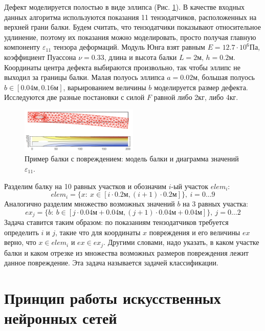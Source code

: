 \documentclass[a4paper,12pt]{article}
\theoremstyle{remark}
\begin{document}
	Дефект моделируется полостью в виде эллипса (Рис. \ref{fig:beam_sample}). В качестве входных данных алгоритма используются показания 11 тензодатчиков, расположенных на верхней грани балки. Будем считать, что тензодатчики показывают относительное удлинение, поэтому их показания можно моделировать, просто получая главную компоненту $\varepsilon_{11}$ тензора деформаций. Модуль Юнга взят равным $E = 12.7 \cdot 10^6 \text{Па}$, коэффициент Пуассона $\nu = 0.33$, длина и высота балки $L = 2 \text{м, } h = 0.2 \text{м}$. Координаты центра дефекта выбираются произвольно, так чтобы эллипс не выходил за границы балки. Малая полуось эллипса $a = 0.02 \text{м}$, большая полуось $b \in [0.04\text{м}, 0.16\text{м}]$, варьированием величины $b$ моделируется размер дефекта. Исследуются две разные постановки с силой $F$ равной либо 2кг, либо 4кг.
	\begin{figure}[h]
		\centering
		\includegraphics[width=0.5\textwidth]{beam_sample.png}
		\caption{Пример балки с повреждением: модель балки и диаграмма значений $\varepsilon_{11}$.}
		\label{fig:beam_sample}
	\end{figure}

	Разделим балку на 10 равных участков и обозначим $i$-ый участок $elem_i$:
	\begin{equation}
		elem_i = \{x: \ x \in [i \cdot 0.2\text{м}, (i+1) \cdot 0.2\text{м}]\}, \ i=0 \dots 9
	\end{equation}
	Аналогично разделим множество возможных значений $b$ на 3 равных участка:
	\begin{equation}
		ex_j = \{b: \ b \in [j \cdot 0.04\text{м} + 0.04\text{м}, (j+1) \cdot 0.04\text{м} + 0.04\text{м}]\}, \ j=0 \dots 2
	\end{equation}
	Задача ставится таким образом: по показаниям тензодатчиков требуется определить $i$ и $j$, такие что для координаты $x$ повреждения и его величины $ex$ верно, что $x \in elem_i$ и $ex \in ex_j$. Другими словами, надо указать, в каком участке балки и каком отрезке из множества возможных размеров повреждения лежит данное повреждение. Эта задача называется задачей классификации.
	
	\newpage
	\section{Принцип работы искусственных нейронных сетей}
	\label{sec:neural_networks}
	
\end{document}
